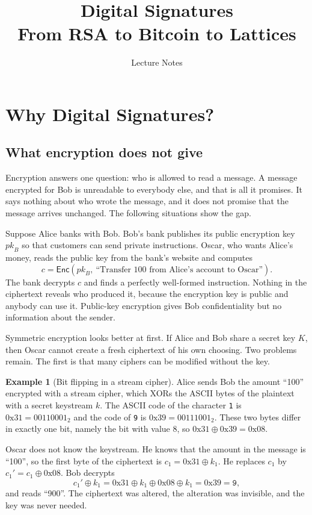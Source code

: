 \documentclass[11pt,a4paper]{article}
\title{Digital Signatures\\[0.3em]\large From RSA to Bitcoin to Lattices}
\author{Lecture Notes}
\date{}
\theoremstyle{definition}
\newtheorem{example}[definition]{Example}
\newcommand{\pk}{\mathit{pk}}
\begin{document}
\maketitle
\tableofcontents
\bigskip

\setcounter{section}{-1}

\section{Why Digital Signatures?}

\subsection{What encryption does not give}

Encryption answers one question: who is allowed to read a message. A message encrypted for Bob is unreadable to everybody else, and that is all it promises. It says nothing about who wrote the message, and it does not promise that the message arrives unchanged. The following situations show the gap.

Suppose Alice banks with Bob. Bob's bank publishes its public encryption key $\pk_B$ so that customers can send private instructions. Oscar, who wants Alice's money, reads the public key from the bank's website and computes
\[
c = \mathsf{Enc}(\pk_B,\ \text{``Transfer 100 from Alice's account to Oscar''}).
\]
The bank decrypts $c$ and finds a perfectly well-formed instruction. Nothing in the ciphertext reveals who produced it, because the encryption key is public and anybody can use it. Public-key encryption gives Bob confidentiality but no information about the sender.

Symmetric encryption looks better at first. If Alice and Bob share a secret key $K$, then Oscar cannot create a fresh ciphertext of his own choosing. Two problems remain. The first is that many ciphers can be modified without the key.

\begin{example}[Bit flipping in a stream cipher]\label{ex:bitflip}
Alice sends Bob the amount ``100'' encrypted with a stream cipher, which XORs the ASCII bytes of the plaintext with a secret keystream $k$. The ASCII code of the character \texttt{1} is $0\mathrm{x}31 = 00110001_2$ and the code of \texttt{9} is $0\mathrm{x}39 = 00111001_2$. These two bytes differ in exactly one bit, namely the bit with value $8$, so $0\mathrm{x}31 \oplus 0\mathrm{x}39 = 0\mathrm{x}08$.

Oscar does not know the keystream. He knows that the amount in the message is ``100'', so the first byte of the ciphertext is $c_1 = 0\mathrm{x}31 \oplus k_1$. He replaces $c_1$ by $c_1' = c_1 \oplus 0\mathrm{x}08$. Bob decrypts
\[
c_1' \oplus k_1 = 0\mathrm{x}31 \oplus k_1 \oplus 0\mathrm{x}08 \oplus k_1 = 0\mathrm{x}39 = \texttt{9},
\]
and reads ``900''. The ciphertext was altered, the alteration was invisible, and the key was never needed.
\end{example}
\end{document}
